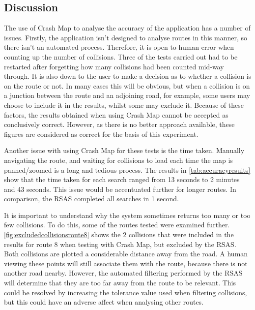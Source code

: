\documentclass[authoryearcitations]{UoYCSproject}
\begin{document}
\subsection{Discussion}

The use of Crash Map to analyse the accuracy of the application has a number of issues. Firstly, the application isn't designed to analyse routes in this manner, so there isn't an automated process. Therefore, it is open to human error when counting up the number of collisions. Three of the tests carried out had to be restarted after forgetting how many collisions had been counted mid-way through. It is also down to the user to make a decision as to whether a collision is on the route or not. In many cases this will be obvious, but when a collision is on a junction between the route and an adjoining road, for example, some users may choose to include it in the results, whilst some may exclude it. Because of these factors, the results obtained when using Crash Map cannot be accepted as conclusively correct. However, as there is no better approach available, these figures are considered as correct for the basis of this experiment.

Another issue with using Crash Map for these tests is the time taken. Manually navigating the route, and waiting for collisions to load each time the map is panned/zoomed is a long and tedious process. The results in \autoref{tab:accuracyresults} show that the time taken for each search ranged from 13 seconds to 2 minutes and 43 seconds. This issue would be accentuated further for longer routes. In comparison, the RSAS completed all searches in 1 second. 

It is important to understand why the system sometimes returns too many or too few collisions. To do this, some of the routes tested were examined further. \autoref{fig:excludedcollisionsroute8} shows the 2 collisions that were included in the results for route 8 when testing with Crash Map, but excluded by the RSAS. Both collisions are plotted a considerable distance away from the road. A human viewing these points will still associate them with the route, because there is not another road nearby. However, the automated filtering performed by the RSAS will determine that they are too far away from the route to be relevant. This could be resolved by increasing the tolerance value used when filtering collisions, but this could have an adverse affect when analysing other routes.
\end{document}

